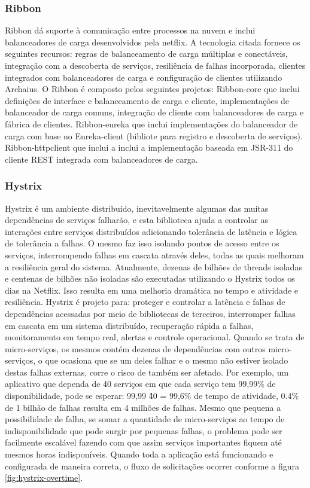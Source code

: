 \subsubsection{Ribbon}
Ribbon dá suporte à comunicação entre processos na nuvem e inclui balanceadores de carga desenvolvidos pela netflix. A tecnologia citada fornece os seguintes recursos: regras de balanceamento de carga múltiplas e conectáveis, integração com a descoberta de serviços, resiliência de falhas incorporada, clientes integrados com balanceadores de carga e configuração de clientes utilizando Archaius. O Ribbon é composto pelos seguintes projetos: Ribbon-core que inclui definições de interface e balanceamento de carga e cliente, implementações de balanceador de carga comuns, integração de cliente com balanceadores de carga e fábrica de clientes. Ribbon-eureka que inclui implementações do balanceador de carga com base no Eureka-client (bibliote para registro e descoberta de serviços). Ribbon-httpclient que inclui a inclui a implementação baseada em JSR-311 do cliente REST integrada com balanceadores de carga.

\subsubsection{Hystrix}
Hystrix é um ambiente distribuído, inevitavelmente algumas das muitas dependências de serviços falharão, e esta biblioteca ajuda a controlar as interações entre serviços distribuídos adicionando tolerância de latência e lógica de tolerância a falhas. O mesmo faz isso isolando pontos de acesso entre os serviços, interrompendo falhas em cascata através deles, todas as quais melhoram a resiliência geral do sistema. Atualmente, dezenas de bilhões de threads isoladas e centenas de bilhões não isoladas são executadas utilizando o Hystrix todos os dias na Netflix. Isso resulta em uma melhoria dramática no tempo e atividade e resiliência. Hystrix é projeto para: proteger e controlar a latência e falhas de dependências acessadas por meio de bibliotecas de terceiros, interromper falhas em cascata em um sistema distribuído, recuperação rápida a falhas, monitoramento em tempo real, alertas e controle operacional. Quando se trata de micro-serviços, os mesmos contém dezenas de dependências com outros micro-serviços, o que ocasiona que se um deles falhar e o mesmo não estiver isolado destas falhas externas, corre o risco de também ser afetado. Por exemplo, um aplicativo que dependa de 40 serviços em que cada serviço tem 99,99\% de disponibilidade, pode se esperar: 99,99 \^ 40 = 99,6\% de tempo de atividade, 0.4\% de 1 bilhão de falhas resulta em 4 milhões de falhas. Mesmo que pequena a possibilidade de falha, se somar a quantidade de micro-serviços ao tempo de indisponibilidade que pode surgir por pequenas falhas, o problema pode ser facilmente escalável fazendo com que assim serviços importantes fiquem até mesmos horas indisponíveis. Quando toda a aplicação está funcionando e configurada de maneira correta, o fluxo de solicitações ocorrer conforme a figura \ref{fig:hystrix-overtime}.

